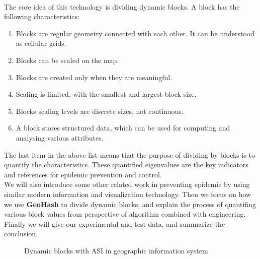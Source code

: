 \documentclass[sigplan,screen]{acmart}
\begin{document}
\\
The core idea of this technology is dividing dynamic blocks. A block has the following characteristics:
\begin{enumerate}
	\item Blocks are regular geometry connected with each other. It can be understood as cellular grids.
	\item Blocks can be scaled on the map.
	\item Blocks are created only when they are meaningful.
	\item Scaling is limited, with the smallest and largest block size.
	\item Blocks scaling levels are discrete sizes, not continuous.
	\item A block stores structured data, which can be used for computing and analysing various attributes.
\end{enumerate}
The last item in the above list means that the purpose of dividing by blocks is to quantify the characteristics. These quantified eigenvalues are the key indicators and references for epidemic prevention and control.
\\
We will also introduce some other related work in preventing epidemic by using similar modern information and visualization technology.
Then we focus on how we use \textbf{GeoHash} to divide dynamic blocks, and explain the process of quantifing various block values from perspective of algorithm combined with engineering.
Finally we will give our experimental and test data, and summarize the conclusion.
\begin{figure}[hptb]
	\centering
	\caption{Dynamic blocks with ASI in geographic information system}
\end{figure}
\end{document}
